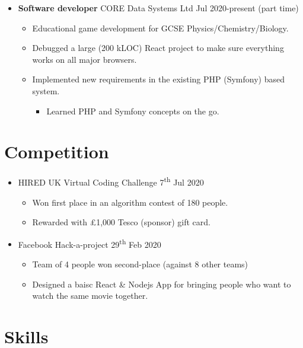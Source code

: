   \begin{itemize}
    \item \textbf{Software developer} \dashdiv{} CORE Data Systems Ltd \dashdiv{} Jul 2020-present (part time)

    \begin{itemize}
      \item Educational game development for GCSE Physics/Chemistry/Biology.
      \item Debugged a large (200 kLOC) React project to make sure everything works on all major browsers.
      \item Implemented new requirements in the existing PHP (Symfony) based system.
      \begin{itemize}
        \item Learned PHP and Symfony concepts on the go.
      \end{itemize}
    \end{itemize}
  \end{itemize}

  \section{Competition}

  \begin{itemize}
    \item HIRED \dashdiv{} UK Virtual Coding Challenge \dashdiv{} 7\textsuperscript{th} Jul 2020
    \begin{itemize}
      \item Won first place in an algorithm contest of 180 people.
      \item Rewarded with £1,000 Tesco (sponsor) gift card.
    \end{itemize}
    \item Facebook \dashdiv{} Hack-a-project \dashdiv{} 29\textsuperscript{th} Feb 2020
    \begin{itemize}
      \item Team of 4 people won second-place (against 8 other teams)
      \item Designed a baisc React \& Nodejs App  for bringing people who want to watch the same movie together.
    \end{itemize}
  \end{itemize}

  \section{Skills}

